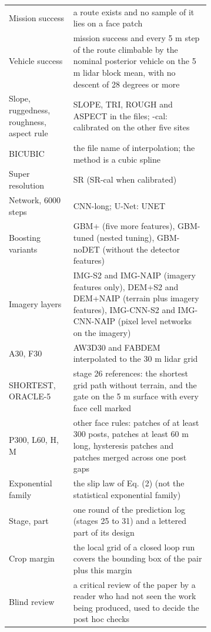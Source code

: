 \documentclass[10pt]{article}
\begin{document}
\begin{table}[H]
\begin{tabular}{@{}lp{0.68\linewidth}@{}}
Mission success & a route exists and no sample of it lies on a face patch \\
Vehicle success & mission success and every 5 m step of the route climbable by the nominal posterior vehicle on the 5 m lidar block mean, with no descent of 28 degrees or more \\
Slope, ruggedness, roughness, aspect rule & SLOPE, TRI, ROUGH and ASPECT in the files; -cal: calibrated on the other five sites \\
BICUBIC & the file name of interpolation; the method is a cubic spline \\
Super resolution & SR (SR-cal when calibrated) \\
Network, 6000 steps & CNN-long; U-Net: UNET \\
Boosting variants & GBM+ (five more features), GBM-tuned (nested tuning), GBM-noDET (without the detector features) \\
Imagery layers & IMG-S2 and IMG-NAIP (imagery features only), DEM+S2 and DEM+NAIP (terrain plus imagery features), IMG-CNN-S2 and IMG-CNN-NAIP (pixel level networks on the imagery) \\
A30, F30 & AW3D30 and FABDEM interpolated to the 30 m lidar grid \\
SHORTEST, ORACLE-5 & stage 26 references: the shortest grid path without terrain, and the gate on the 5 m surface with every face cell marked \\
P300, L60, H, M & other face rules: patches of at least 300 posts, patches at least 60 m long, hysteresis patches and patches merged across one post gaps \\
Exponential family & the slip law of Eq. (2) (not the statistical exponential family) \\
Stage, part & one round of the prediction log (stages 25 to 31) and a lettered part of its design \\
Crop margin & the local grid of a closed loop run covers the bounding box of the pair plus this margin \\
Blind review & a critical review of the paper by a reader who had not seen the work being produced, used to decide the post hoc checks \\
\bottomrule
\end{tabular}
\end{table}
\end{document}

